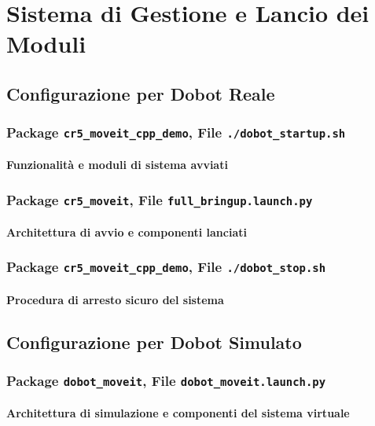 \documentclass[12pt,a4paper,twoside,openright]{book}
\begin{document}
	
	\chapter{Sistema di Gestione e Lancio dei Moduli}
	
	\section{Configurazione per Dobot Reale}
	\subsection{Package \texttt{cr5\_moveit\_cpp\_demo}, File \texttt{./dobot\_startup.sh}}
	\subsubsection{Funzionalità e moduli di sistema avviati}
	
	\subsection{Package \texttt{cr5\_moveit}, File \texttt{full\_bringup.launch.py}}
	\subsubsection{Architettura di avvio e componenti lanciati}
	
	\subsection{Package \texttt{cr5\_moveit\_cpp\_demo}, File \texttt{./dobot\_stop.sh}}
	\subsubsection{Procedura di arresto sicuro del sistema}
	
	\section{Configurazione per Dobot Simulato}
	\subsection{Package \texttt{dobot\_moveit}, File \texttt{dobot\_moveit.launch.py}}
	\subsubsection{Architettura di simulazione e componenti del sistema virtuale}
	
\end{document}
